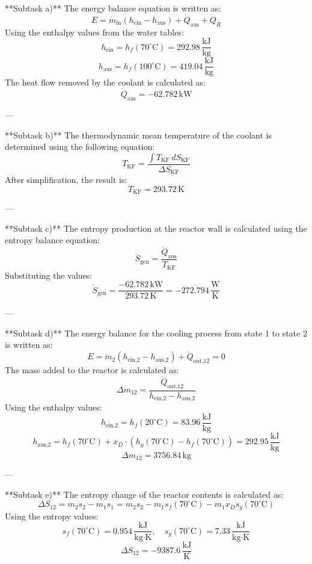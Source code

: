 **Subtask a)**  
The energy balance equation is written as:  
\[
E = \dot{m}_{\text{in}} (h_{\text{ein}} - h_{\text{aus}}) + \dot{Q}_{\text{aus}} + \dot{Q}_R
\]  
Using the enthalpy values from the water tables:  
\[
h_{\text{ein}} = h_f(70^\circ\text{C}) = 292.98 \, \frac{\text{kJ}}{\text{kg}}
\]  
\[
h_{\text{aus}} = h_f(100^\circ\text{C}) = 419.04 \, \frac{\text{kJ}}{\text{kg}}
\]  
The heat flow removed by the coolant is calculated as:  
\[
\dot{Q}_{\text{aus}} = -62.782 \, \text{kW}
\]  

---

**Subtask b)**  
The thermodynamic mean temperature of the coolant is determined using the following equation:  
\[
T_{\text{KF}} = \frac{\int T_{\text{KF}} \, dS_{\text{KF}}}{\Delta S_{\text{KF}}}
\]  
After simplification, the result is:  
\[
T_{\text{KF}} = 293.72 \, \text{K}
\]  

---

**Subtask c)**  
The entropy production at the reactor wall is calculated using the entropy balance equation:  
\[
\dot{S}_{\text{gen}} = \frac{\dot{Q}_{\text{aus}}}{T_{\text{KF}}}
\]  
Substituting the values:  
\[
\dot{S}_{\text{gen}} = \frac{-62.782 \, \text{kW}}{293.72 \, \text{K}} = -272.794 \, \frac{\text{W}}{\text{K}}
\]  

---

**Subtask d)**  
The energy balance for the cooling process from state 1 to state 2 is written as:  
\[
E = \dot{m}_2 (h_{\text{ein,2}} - h_{\text{aus,2}}) + \dot{Q}_{\text{out,12}} = 0
\]  
The mass added to the reactor is calculated as:  
\[
\Delta m_{12} = \frac{\dot{Q}_{\text{out,12}}}{h_{\text{ein,2}} - h_{\text{aus,2}}}
\]  
Using the enthalpy values:  
\[
h_{\text{ein,2}} = h_f(20^\circ\text{C}) = 83.96 \, \frac{\text{kJ}}{\text{kg}}
\]  
\[
h_{\text{aus,2}} = h_f(70^\circ\text{C}) + x_D \cdot (h_g(70^\circ\text{C}) - h_f(70^\circ\text{C})) = 292.95 \, \frac{\text{kJ}}{\text{kg}}
\]  
\[
\Delta m_{12} = 3756.84 \, \text{kg}
\]  

---

**Subtask e)**  
The entropy change of the reactor contents is calculated as:  
\[
\Delta S_{12} = m_2 s_2 - m_1 s_1 = m_2 s_2 - m_1 s_f(70^\circ\text{C}) - m_1 x_D s_g(70^\circ\text{C})
\]  
Using the entropy values:  
\[
s_f(70^\circ\text{C}) = 0.954 \, \frac{\text{kJ}}{\text{kg·K}}, \quad s_g(70^\circ\text{C}) = 7.33 \, \frac{\text{kJ}}{\text{kg·K}}
\]  
\[
\Delta S_{12} = -9387.6 \, \frac{\text{kJ}}{\text{K}}
\]